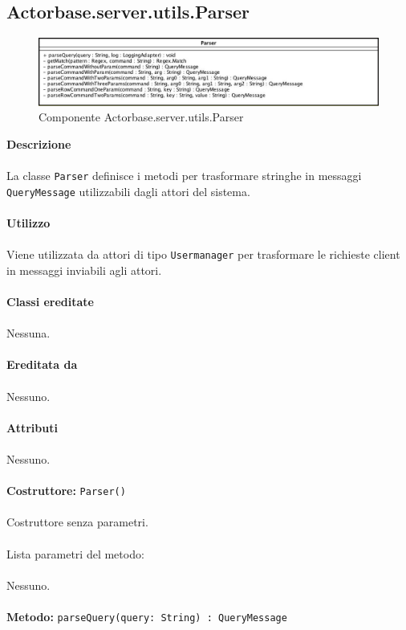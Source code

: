 \documentclass[a4paper]{article}
\begin{document}
	\subsection{Actorbase.server.utils.Parser}
		\begin{figure}[H]
			\centering
			\includegraphics[width=\textwidth]{Server/parserClass.jpg}
			\caption{Componente Actorbase.server.utils.Parser}
		\end{figure}
		\textbf{Descrizione}
			\\ \\
			La classe \texttt{Parser} definisce i metodi per trasformare stringhe in messaggi \texttt{QueryMessage} utilizzabili dagli attori del sistema.
			\\ \\
		\textbf{Utilizzo}
			\\ \\
			Viene utilizzata da attori di tipo \texttt{Usermanager} per trasformare le richieste client in messaggi inviabili agli attori.
			\\ \\
		\textbf{Classi ereditate}
			\\ \\
			Nessuna.
			\\ \\
		\textbf{Ereditata da}
			\\ \\
			Nessuno.
			\\ \\
		\textbf{Attributi}
			\\ \\ 
			Nessuno.
			\\ \\
			\textbf{Costruttore: }\texttt{Parser()}
			\\ \\
			Costruttore senza parametri.
			\\ \\
			Lista parametri del metodo:
			\\ \\
			Nessuno.
			\\ \\
			\textbf{Metodo: }\texttt{parseQuery(query: String) : QueryMessage}
\end{document}
